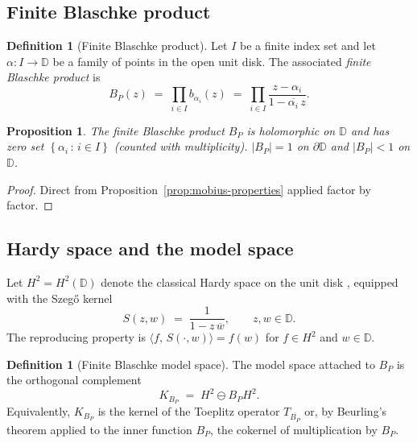 \documentclass[11pt]{article}
\theoremstyle{plain}
\newtheorem{proposition}[theorem]{Proposition}
\theoremstyle{definition}
\newtheorem{definition}[theorem]{Definition}
\theoremstyle{remark}
\newcommand{\HtH}{H^{2}}
\newcommand{\KBp}{K_{B_{P}}}
\newcommand{\D}{\mathbb{D}}
\newcommand{\inn}[2]{\langle #1,\, #2 \rangle}
\newcommand{\conj}[1]{\overline{#1}}
\newcommand{\Set}[1]{\left\{ #1 \right\}}
\begin{document}
\subsection{Finite Blaschke product}

\begin{definition}[Finite Blaschke product]\label{def:blaschke-product}
Let $I$ be a finite index set and let $\alpha\colon I \to \D$ be a family
of points in the open unit disk.  The associated \emph{finite Blaschke
product} is
\begin{equation}\label{eq:blaschke-product}
  B_{P}(z) \;=\; \prod_{i\in I} b_{\alpha_{i}}(z)
              \;=\; \prod_{i\in I}\frac{z-\alpha_{i}}{1-\conj{\alpha_{i}}\,z}.
\end{equation}
\end{definition}

\begin{proposition}\label{prop:bp-zero-set}
The finite Blaschke product $B_{P}$ is holomorphic on $\D$ and has zero set
$\Set{\alpha_{i} \,:\, i \in I}$ (counted with multiplicity).  $|B_{P}|=1$
on $\partial\D$ and $|B_{P}|<1$ on $\D$.
\end{proposition}

\begin{proof}
Direct from Proposition~\ref{prop:mobius-properties} applied factor by
factor.
\end{proof}

\subsection{Hardy space and the model space}

Let $\HtH = \HtH(\D)$ denote the classical Hardy space on the unit disk
\cite{garnett-bounded}, equipped with the Szegő kernel
\begin{equation}\label{eq:szego}
  S(z,w) \;=\; \frac{1}{1-z\,\conj{w}}, \qquad z,w\in\D.
\end{equation}
The reproducing property is
\(\inn{f}{S(\cdot,w)} = f(w)\) for $f\in\HtH$ and $w\in\D$.

\begin{definition}[Finite Blaschke model space]\label{def:model-space}
The model space attached to $B_{P}$ is the orthogonal complement
\begin{equation}\label{eq:model-space}
  \KBp \;=\; \HtH \ominus B_{P}\HtH.
\end{equation}
Equivalently, $\KBp$ is the kernel of the Toeplitz operator $T_{\conj{B_{P}}}$
or, by Beurling's theorem applied to the inner function $B_{P}$, the cokernel
of multiplication by $B_{P}$.
\end{definition}
\end{document}
